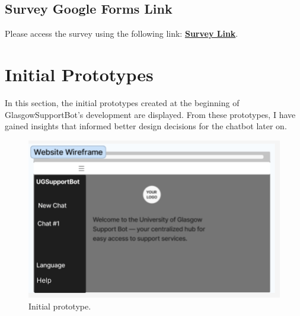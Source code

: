 \documentclass{l4proj}
\begin{document}
\begin{appendices}
\section*{\textbf{Survey Google Forms Link}}
Please access the survey using the following link: \href{https://docs.google.com/forms/d/e/1FAIpQLSdlZLvJn7b81gKnwkcBIw-7jVdgHIu1LeQ7mDHLe96U08lMFQ/viewform?usp=sf_link}{\textbf{Survey Link}}.

\chapter{Initial Prototypes}
\label{Initial Prototypes}

In this section, the initial prototypes created at the beginning of  GlasgowSupportBot's development are displayed. From these prototypes, I have gained insights that informed better design decisions for the chatbot later on.

\begin{figure}[h!]
  \centering
  \begin{adjustbox}{center,max height=0.5\textheight, max width=\linewidth}
    \includegraphics{images/initial1.png}
  \end{adjustbox}
  \caption{Initial prototype.}
\end{figure}


\end{appendices}
\end{document}
